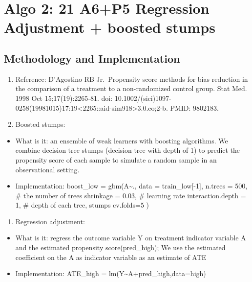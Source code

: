 \documentclass[]{article}
\providecommand{\tightlist}{%
  \setlength{\itemsep}{0pt}\setlength{\parskip}{0pt}}
\begin{document}
\hypertarget{algo-2-21-a6p5-regression-adjustment-boosted-stumps}{%
\section{Algo 2: 21 A6+P5 Regression Adjustment + boosted
stumps}\label{algo-2-21-a6p5-regression-adjustment-boosted-stumps}}

\hypertarget{methodology-and-implementation-1}{%
\subsection{Methodology and
Implementation}\label{methodology-and-implementation-1}}

\begin{enumerate}
\def\labelenumi{\arabic{enumi}.}
\tightlist
\item
  Reference: D'Agostino RB Jr.~Propensity score methods for bias
  reduction in the comparison of a treatment to a non-randomized control
  group. Stat Med. 1998 Oct 15;17(19):2265-81. doi:
  10.1002/(sici)1097-0258(19981015)17:19\textless{}2265::aid-sim918\textgreater{}3.0.co;2-b.
  PMID: 9802183.
\item
  Boosted stumps:
\end{enumerate}

\begin{itemize}
\tightlist
\item
  What is it: an ensemble of weak learners with boosting algorithms. We
  combine decision tree stumps (decision tree with depth of 1) to
  predict the propensity score of each sample to simulate a random
  sample in an observational setting.
\item
  Implementation: boost\_low = gbm(A\textasciitilde{}., data =
  train\_low{[}-1{]}, n.trees = 500, \# the number of trees shrinkage =
  0.03, \# learning rate interaction.depth = 1, \# depth of each tree,
  stumps cv.folds=5 )
\end{itemize}

\begin{enumerate}
\def\labelenumi{\arabic{enumi}.}
\setcounter{enumi}{2}
\tightlist
\item
  Regression adjustment:
\end{enumerate}

\begin{itemize}
\tightlist
\item
  What is it: regress the outcome variable Y on treatment indicator
  variable A and the estimated propensity score(pred\_high); We use the
  estimated coefficient on the A as indicator variable as an estimate of
  ATE
\item
  Implementation: ATE\_high =
  lm(Y\textasciitilde{}A+pred\_high,data=high)
\end{itemize}
\end{document}
